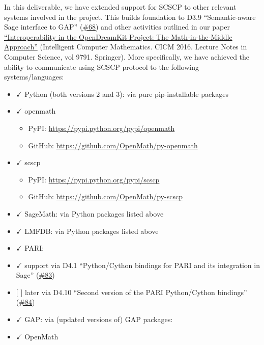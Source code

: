 In this deliverable, we have extended support for SCSCP to other
relevant systems involved in the project. This builds foundation to D3.9
``Semantic-aware Sage interface to GAP''
(\href{https://github.com/OpenDreamKit/OpenDreamKit/issues/68}{\#68})
and other activities outlined in our paper
\href{https://dx.doi.org/10.1007/978-3-319-42547-4_9}{``Interoperability
in the OpenDreamKit Project: The Math-in-the-Middle Approach''}
(Intelligent Computer Mathematics. CICM 2016. Lecture Notes in Computer
Science, vol 9791. Springer). More specifically, we have achieved the
ability to communicate using SCSCP protocol to the following
systems/languages:

\begin{itemize}
\tightlist
\item
  \(\checkmark\) Python (both versions 2 and 3): via pure
  pip-installable packages
\item
  \(\checkmark\) openmath

  \begin{itemize}
  \tightlist
  \item
    PyPI: \url{https://pypi.python.org/pypi/openmath}
  \item
    GitHub: \url{https://github.com/OpenMath/py-openmath}
  \end{itemize}
\item
  \(\checkmark\) scscp

  \begin{itemize}
  \tightlist
  \item
    PyPI: \url{https://pypi.python.org/pypi/scscp}
  \item
    GitHub: \url{https://github.com/OpenMath/py-scscp}
  \end{itemize}
\item
  \(\checkmark\) SageMath: via Python packages listed above
\item
  \(\checkmark\) LMFDB: via Python packages listed above
\item
  \(\checkmark\) PARI:
\item
  \(\checkmark\) support via D4.1 ``Python/Cython bindings for PARI and
  its integration in Sage''
  (\href{https://github.com/OpenDreamKit/OpenDreamKit/issues/83}{\#83})
\item
  {[} {]} later via D4.10 ``Second version of the PARI Python/Cython
  bindings''
  (\href{https://github.com/OpenDreamKit/OpenDreamKit/issues/84}{\#84})
\item
  \(\checkmark\) GAP: via (updated versions of) GAP packages:
\item
  \(\checkmark\) OpenMath


\end{itemize}
